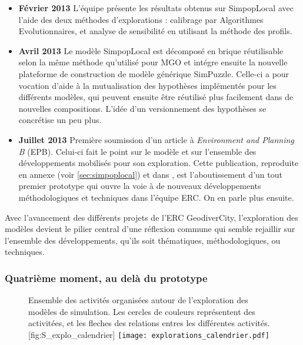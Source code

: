 \begin{itemize}[label=\textbullet]
\item {\textbf{Février 2013}} L'équipe présente les résultats obtenus sur SimpopLocal avec l'aide des deux méthodes d'explorations : calibrage par Algorithmes Evolutionnaires, et analyse de sensibilité en utilisant la méthode des profils. 

\item {\textbf{Avril 2013}} Le modèle SimpopLocal est décomposé en brique réutilisable selon la même méthode qu'utilisé pour MGO et intégre ensuite la nouvelle plateforme de construction de modèle générique SimPuzzle. Celle-ci a pour vocation d'aide à la mutualisation des hypothèses implémentés pour les différents modèles, qui peuvent ensuite être réutilisé plus facilement dans de nouvelles compositions. L'idée d'un versionnement des hypothèses se concrétise un peu plus. 

\item {\textbf{Juillet 2013}} Première soumission d'un article à \textit{Environment and Planning B} (EPB). Celui-ci fait le point sur le modèle et sur l'ensemble des développements mobilisés pour son exploration. Cette publication, reproduite en annexe (voir \ref{sec:simpoplocal}) et dans \textcite{Schmitt2015}, est l'aboutissement d'un tout premier prototype qui ouvre la voie à de nouveaux développements méthodologiques et techniques dans l'équipe ERC. On en parle plus ensuite.

\end{itemize}

Avec l'avancement des différents projets de l'ERC GeodiverCity, l'exploration des modèles devient le pilier central d'une réflexion commune qui semble rejaillir sur l'ensemble des développements, qu'ils soit thématiques, méthodologiques, ou techniques.

\subsubsection{Quatrième moment, au delà du prototype}
\label{sssec:quatrieme_moment}

\begin{figure}[t]
\begin{sidecaption}[fortoc]{ Ensemble des activités organisées autour de l'exploration des modèles de simulation. Les cercles de couleurs représentent des activitées, et les fleches des relations entres les différentes activités.}[fig:S_explo_calendrier]
  \centering
 \texttt{[image: explorations\_calendrier.pdf]}
  \end{sidecaption}
\end{figure}


